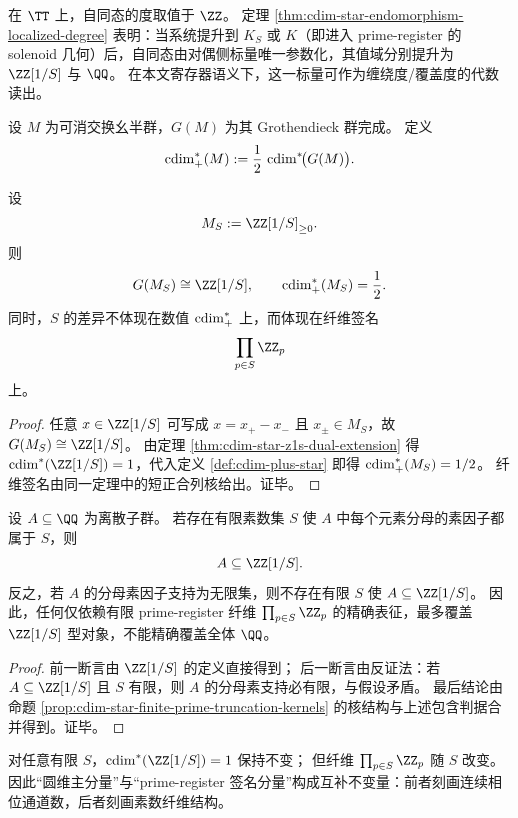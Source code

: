 \begin{remark}\label{rem:cdim-star-winding-localization}
在 \(\TT\) 上，自同态的度取值于 \(\ZZ\)。
定理 \ref{thm:cdim-star-endomorphism-localized-degree} 表明：当系统提升到 \(K_S\) 或 \(K\)（即进入 prime-register 的 solenoid 几何）后，自同态由对偶侧标量唯一参数化，其值域分别提升为 \(\ZZ[1/S]\) 与 \(\QQ\)。
在本文寄存器语义下，这一标量可作为缠绕度/覆盖度的代数读出。
\end{remark}

\begin{definition}[扩展半圆维]\label{def:cdim-plus-star}
设 \(M\) 为可消交换幺半群，\(G(M)\) 为其 Grothendieck 群完成。
定义
\[
\operatorname{cdim}_+^\ast(M):=\frac12\,\operatorname{cdim}^\ast\!\bigl(G(M)\bigr).
\]
\end{definition}

\begin{proposition}[局部化正锥的半圆维与素数签名]\label{prop:cdim-plus-star-localized-cone}
设
\[
M_S:=\ZZ[1/S]_{\ge 0}.
\]
则
\[
G(M_S)\cong \ZZ[1/S],\qquad
\cdim_+^\ast(M_S)=\frac12.
\]
同时，\(S\) 的差异不体现在数值 \(\operatorname{cdim}_+^\ast\) 上，而体现在纤维签名
\[
\prod_{p\in S}\ZZ_p
\]
上。
\end{proposition}
\begin{proof}
任意 \(x\in \ZZ[1/S]\) 可写成 \(x=x_+-x_-\) 且 \(x_\pm\in M_S\)，故 \(G(M_S)\cong \ZZ[1/S]\)。
由定理 \ref{thm:cdim-star-z1s-dual-extension} 得 \(\cdim^\ast(\ZZ[1/S])=1\)，代入定义 \ref{def:cdim-plus-star} 即得 \(\operatorname{cdim}_+^\ast(M_S)=1/2\)。
纤维签名由同一定理中的短正合列核给出。证毕。
\end{proof}

\begin{corollary}\label{cor:cdim-star-finite-prime-register-limit}
设 \(A\subseteq \QQ\) 为离散子群。
若存在有限素数集 \(S\) 使 \(A\) 中每个元素分母的素因子都属于 \(S\)，则
\[
A\subseteq \ZZ[1/S].
\]
反之，若 \(A\) 的分母素因子支持为无限集，则不存在有限 \(S\) 使 \(A\subseteq \ZZ[1/S]\)。
因此，任何仅依赖有限 prime-register 纤维
\(
\prod_{p\in S}\ZZ_p
\)
的精确表征，最多覆盖 \(\ZZ[1/S]\) 型对象，不能精确覆盖全体 \(\QQ\)。
\end{corollary}
\begin{proof}
前一断言由 \(\ZZ[1/S]\) 的定义直接得到；
后一断言由反证法：若 \(A\subseteq \ZZ[1/S]\) 且 \(S\) 有限，则 \(A\) 的分母素支持必有限，与假设矛盾。
最后结论由命题 \ref{prop:cdim-star-finite-prime-truncation-kernels} 的核结构与上述包含判据合并得到。证毕。
\end{proof}

\begin{remark}[主分量与签名分量的分离]\label{rem:cdim-star-main-vs-signature}
对任意有限 \(S\)，\(\cdim^\ast(\ZZ[1/S])=1\) 保持不变；
但纤维 \(\prod_{p\in S}\ZZ_p\) 随 \(S\) 改变。
因此“圆维主分量”与“prime-register 签名分量”构成互补不变量：前者刻画连续相位通道数，后者刻画素数纤维结构。
\end{remark}

\endinput

